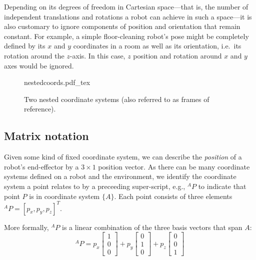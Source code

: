 Depending on its degrees of freedom in Cartesian space---that is, the number of independent translations and rotations a robot can achieve in such a space---it is also customary to ignore components of position and orientation that remain constant.
For example, a simple floor-cleaning robot's pose might be completely defined by its $x$ and $y$ coordinates in a room as well as its orientation, i.e.\ its rotation around the $z$-axis. In this case, $z$ position and rotation around $x$ and $y$ axes would be ignored.

\begin{figure}
    \centering
    \def\svgwidth{\textwidth}
    {nestedcoords.pdf_tex}
    \caption{Two nested coordinate systems (also referred to as frames of reference).}
    \label{fig:nestedcoords}
\end{figure}

\subsection{Matrix notation}
Given some kind of fixed coordinate system, we can describe the \textsl{position} of a robot's end-effector by a $3\times1$ position vector.
As there can be many coordinate systems defined on a robot and the environment, we identify the coordinate system a point relates to by a preceeding super-script, e.g., $ ^AP$ to indicate that point $P$ is in coordinate system $\{A\}$.
Each point consists of three elements $ ^AP=[p_x, p_y, p_z]^T$.

More formally, $^AP$ is a linear combination of the three basis vectors that span $A$:
\begin{equation}
^AP=p_x\left[\begin{array}{c}1\\0\\0\end{array}\right]+p_y\left[\begin{array}{c}0\\1\\0\end{array}\right]+p_z\left[\begin{array}{c}0\\0\\1\end{array}\right]\label{eq:basis}
\end{equation}


